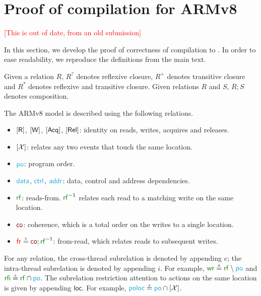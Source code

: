\section{Proof of compilation for ARMv8}
\label{sec:arm:proof}
\textcolor{red}{[This is out of date, from an old submission]}

In this section, we develop the proof of correctness of compilation to \armeight.  In order to ease readability, we reproduce the definitions from the main text. 



Given a relation $R$, $R^?$ denotes reflexive closure, $R^+$ denotes
transitive closure and $R^*$ denotes reflexive and transitive closure.  Given relations $R$ and $S$, $R;S$ denotes composition.


The ARMv8 model is described using the following relations.
\begin{itemize}
\item $[\mathsf{R}]$, $[\mathsf{W}]$, $[\mathsf{Acq}]$, $[\mathsf{Rel}]$: identity on reads, writes, acquires
  and releases.
\item $[\mathcal{X}]$: relates any two events that touch the same location.
\item $\rpox$: program order.
\item $\rdata$, $\rctrl$, $\raddr$: data, control and address dependencies.
\item $\rrfx$: reads-from. $\rrfx^{-1}$ relates each read to a matching write
  on the same location.
\item $\rco$: coherence, which is a total order on the writes to a single
  location.
\item ${\rfr}\eqdef{\rco};\rrfx^{-1}$: from-read, which relates reads to
  subsequent writes.
\end{itemize}
For any relation, the cross-thread subrelation is denoted by appending $e$;
the intra-thread subrelation is denoted by appending $i$.  For example,
${\rrfe}\eqdef{\rrfx}\setminus{\rpox}$ and ${\rrfi}\eqdef{\rrfx}\cap{\rpox}$.
The subrelation restriction attention to actions on the same location is
given by appending $\mathsf{loc}$.  For example, ${\rpoloc}\eqdef{\rpox}\cap{\IDLoc}$.

